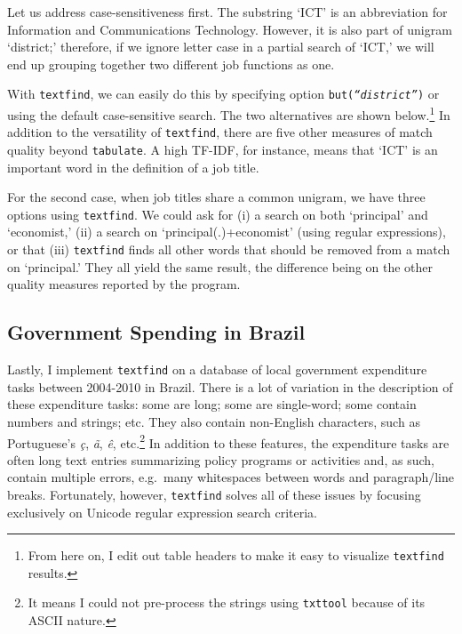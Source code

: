 Let us address case-sensitiveness first. The substring `ICT' is an abbreviation for Information and Communications Technology. However, it is also part of unigram `district;' therefore, if we ignore letter case in a partial search of `ICT,' we will end up grouping together two different job functions as one.

\begin{stlog}
\nullskip
\end{stlog}

With {\tt textfind}, we can easily do this by specifying option {\tt but({\it ``district''})} or using the default case-sensitive search. The two alternatives are shown below.\footnote{From here on, I edit out table headers to make it easy to visualize {\tt textfind} results.} In addition to the versatility of {\tt textfind}, there are five other measures of match quality beyond {\tt tabulate}. A high TF-IDF, for instance, means that `ICT' is an important word in the definition of a job title.

\begin{stlog}
\nullskip
\end{stlog}

For the second case, when job titles share a common unigram, we have three options using {\tt textfind}. We could ask for (i) a search on both `principal' and `economist,' (ii) a search on `principal(.)+economist' (using regular expressions), or that (iii) {\tt textfind} finds all other words that should be removed from a match on `principal.' They all yield the same result, the difference being on the other quality measures reported by the program.

\begin{stlog}
\nullskip
\end{stlog}

\subsection{Government Spending in Brazil} \label{subsec:4.3}
Lastly, I implement {\tt textfind} on a database of local government expenditure tasks between 2004-2010 in Brazil. There is a lot of variation in the description of these expenditure tasks: some are long; some are single-word; some contain numbers and strings; etc. They also contain non-English characters, such as Portuguese's {\it \c c}, {\it \~ a}, {\it \^ e}, etc.\footnote{It means I could not pre-process the strings using {\tt txttool} because of its ASCII nature.} In addition to these features, the expenditure tasks are often long text entries summarizing policy programs or activities and, as such, contain multiple errors, e.g.~many whitespaces between words and paragraph/line breaks. Fortunately, however, {\tt textfind} solves all of these issues by focusing exclusively on Unicode regular expression search criteria.


